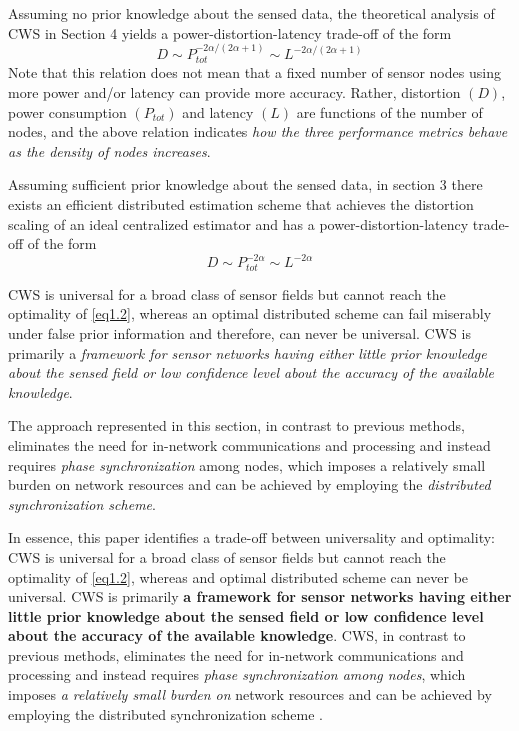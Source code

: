 Assuming no prior knowledge about the sensed data, the theoretical analysis of CWS in Section 4 yields a power-distortion-latency trade-off of the form
\begin{equation}
    D \sim P_{tot}^{-2 \alpha/(2\alpha + 1)} \sim L^{-2\alpha/(2\alpha + 1)}
    \label{eq1.1}
\end{equation}
Note that this relation does not mean that a fixed number of sensor nodes using more power and/or latency can provide more accuracy. Rather, distortion $(D)$, power consumption $(P_{tot})$ and latency $(L)$ are functions of the number of nodes, and the above relation indicates \emph{\textcolor[rgb]{1,0,0}{how the three performance metrics behave as the density of nodes increases}}.

Assuming sufficient prior knowledge about the sensed data, in section 3 there exists an efficient distributed estimation scheme that achieves the distortion scaling of an ideal centralized estimator and has a power-distortion-latency trade-off of the form
\begin{equation}
    D \sim P_{tot}^{-2\alpha} \sim L^{-2\alpha}
    \label{eq1.2}
\end{equation}

CWS is universal for a broad class of sensor fields but cannot reach the optimality of \cref{eq1.2}, whereas an optimal distributed scheme can fail miserably under false prior information and therefore, can never be universal. CWS is primarily a \emph{\textcolor[rgb]{1,0,0}{framework for sensor networks having either little prior knowledge about the sensed field or low confidence level about the accuracy of the available knowledge}}.

The approach represented in this section, in contrast to previous methods, eliminates the need for in-network communications and processing and instead requires \emph{\textcolor[rgb]{1,0,0}{phase synchronization}} among nodes, which imposes a relatively small burden on network resources and can be achieved by employing the \emph{\textcolor[rgb]{1,0,0}{distributed synchronization scheme}}. 

In essence, this paper identifies a trade-off between universality and optimality: CWS is universal for a broad class of sensor fields but cannot reach the optimality of \cref{eq1.2}, whereas and optimal distributed scheme can never be universal. CWS is primarily \textbf{\textcolor[rgb]{1,0,0}{a framework for sensor networks having either little prior knowledge about the sensed field or low confidence level about the accuracy of the available knowledge}}. CWS, in contrast to previous methods, eliminates the need for in-network communications and processing and instead requires \emph{\textcolor[rgb]{1,0,0}{phase synchronization among nodes}}, which imposes \emph{\textcolor[rgb]{1,0,0}{a relatively small burden on}} network resources and can be achieved by employing the distributed synchronization scheme \cite{Mudumbai2005}. 


